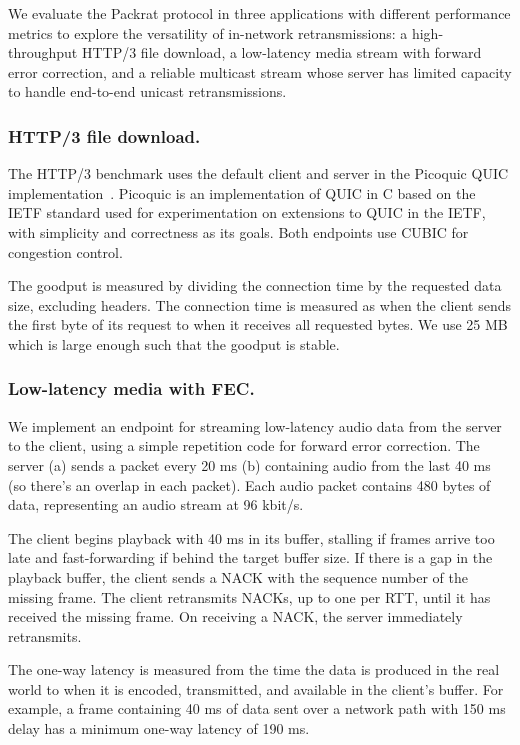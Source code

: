 We evaluate the Packrat protocol in three applications with different performance
metrics to explore the versatility of in-network retransmissions:
a high-throughput HTTP/3 file download, a low-latency media stream with forward
error correction, and a reliable multicast stream whose server has limited
capacity to handle end-to-end unicast retransmissions.

\subsubsection{HTTP/3 file download.}

The HTTP/3 benchmark uses the default client and server in the Picoquic QUIC
implementation~\cite{picoquic}. Picoquic is an implementation of QUIC in C
based on the IETF standard used for experimentation on extensions to QUIC in
the IETF, with simplicity and correctness as its goals. Both endpoints use
CUBIC for congestion control.

The goodput is measured by dividing the connection time by the requested data
size, excluding headers.
The connection time is measured as when the client sends the first
byte of its request to when it receives all requested bytes.
We use 25 MB which is large enough such that the goodput is stable.

\subsubsection{Low-latency media with FEC.}

We implement an endpoint for streaming low-latency audio data from the server
to the client, using a simple repetition code for forward error correction.
The server (a) sends a packet every 20 ms
(b) containing audio from the last 40 ms (so there's an overlap in each
packet). Each audio packet contains 480 bytes of data, representing an audio
stream at 96 kbit/s.

The client begins playback with 40 ms in its buffer, stalling if frames arrive
too late and fast-forwarding if behind the target buffer size.
If there is a gap in the
playback buffer, the client sends a NACK with the sequence number of the
missing frame. The client retransmits NACKs, up to one per RTT, until it has
received the missing frame. On receiving a NACK, the server immediately
retransmits.

The one-way latency is measured from the time the data is produced in the real
world to when it is encoded, transmitted, and available in the client's
buffer. For example, a frame containing 40 ms of data sent over a network path
with 150 ms delay has a minimum one-way latency of 190 ms.

